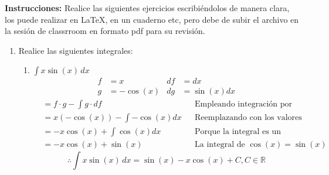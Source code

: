 \documentclass[letterpaper]{article}
\newcommand{\R}{\mathds{R}}
\renewcommand{\*}{\cdot}
\theoremstyle{definition}
\begin{document}
\noindent \textbf{Instrucciones:} Realice las siguientes ejercicios escribiéndolos  de manera clara, los puede realizar en \LaTeX, en un cuaderno etc, pero debe de subir el archivo en la sesión de classrroom en formato pdf para su revisión.


\begin{enumerate}



\section*{Métodos de integración}

\subsection*{Integración por partes (2.5 pts.)}
\item Realice las siguientes integrales:
\begin{enumerate}
	\item$\displaystyle \int x \sin(x) \, dx$
	\begin{align*}
		f &= x & df &= dx\\
		g &= -\cos(x) & dg &= \sin(x)dx
	\end{align*}
	\begin{align*}
		&= f \* g - \int g\*df &&\text{Empleando integración por partes}\\
		&= x(-\cos(x)) - \int -\cos(x)dx &&\text{Reemplazando con los valores elegidos}\\
		&= -x\cos(x) + \int \cos(x)dx &&\text{Porque la integral es un operador lineal}\\
		&= -x\cos(x) + \sin(x) &&\text{La integral de }\cos(x) = \sin(x)
	\end{align*}
	\[ \therefore \int x \sin(x) \, dx = \sin(x) - x\cos(x) + C, C \in \R  \]
	

\end{enumerate}
\end{enumerate}
\end{document}
